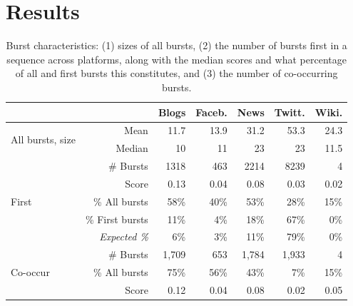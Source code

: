 \documentclass[letterpaper]{article} %
\begin{document}

\section{Results}

\begin{table}[t]
    \centering
    \begin{tabular}{@{}l |r | r r r r r @{}}
    & & Blogs & Faceb. & News & Twitt. & Wiki. \\
    \hline
    \multirow{2}{7em}{All bursts, size} & Mean & 11.7 & 13.9 & 31.2 & 53.3 & 24.3 \\
    & Median & 10 & 11 & 23 & 23 & 11.5 \\
    \hline
    \hline
    \multirow{5}{7em}{First} & \# Bursts & 1318 & 463 & 2214 & 8239 & 4\\
    \cline{2-7} 
    & Score & 0.13 & 0.04 & 0.08 & 0.03 & 0.02 \\ 
    \cline{2-7} 
    & \% All bursts & 58\% & 40\% & 53\% & 28\% & 15\% \\
    \cline{2-7} 
    & \% First bursts & 11\% & 4\% & 18\% & 67\% & 0\% \\
    & \textit{Expected \%} & 6\% & 3\% & 11\% & 79\% & 0\% \\
    \hline
    \hline
    \multirow{3}{7em}{Co-occur} & \# Bursts & 1,709 & 653 & 1,784 & 1,933 & 4\\
    & \% All bursts & 75\% & 56\% & 43\% & 7\% & 15\% \\
    \cline{2-7} 
    & Score & 0.12 & 0.04 & 0.08 & 0.02 & 0.05 \\ 
    \end{tabular}
    \caption{Burst characteristics: (1) sizes of all bursts, (2) the number of bursts first in a sequence across platforms, along with the median scores and what percentage of all and first bursts this constitutes, and (3) the number of co-occurring bursts.}
    \label{tab:first_co_occurring}
\end{table}
\end{document}
